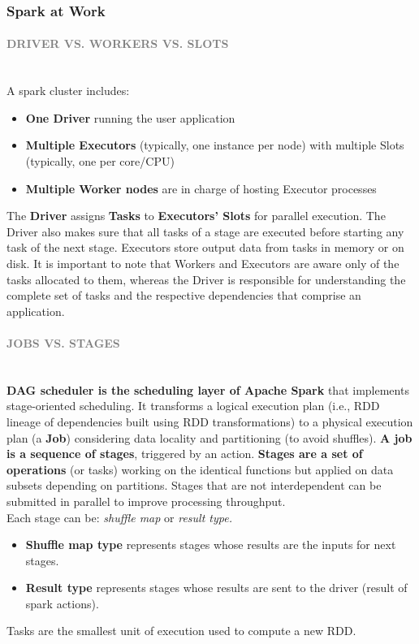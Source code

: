 \documentclass[10pt,a4paper]{article}
\newcommand{\myparagraph}[1]{\paragraph{\normalsize{\textcolor{gray}{\uppercase{\textbf{#1}}}} }\mbox{} \vspace{0.5em}\\}
\begin{document}
\subsubsection{Spark at Work}
\myparagraph{Driver vs. Workers vs. Slots}
A spark cluster includes:
\begin{itemize}
	\item \textbf{One Driver} running the user application
	\item \textbf{Multiple Executors} (typically, one instance per node) with multiple Slots (typically, one per core/CPU)
	\item \textbf{Multiple Worker nodes} are in charge of hosting Executor processes
\end{itemize}
The \textbf{Driver} assigns \textbf{Tasks} to \textbf{Executors’ Slots} for parallel execution. The Driver also makes sure that all tasks of a stage are executed before starting any task of the next stage.
Executors store output data from tasks in memory or on disk. It is important to note that Workers and Executors are aware only of the tasks allocated to them, whereas the Driver is responsible for understanding the complete set of tasks and the respective dependencies that comprise an application.
\myparagraph{Jobs vs. Stages}
\textbf{DAG scheduler is the scheduling layer of Apache Spark} that implements stage-oriented scheduling. It transforms a logical execution plan (i.e., RDD lineage of dependencies built using RDD transformations) to a physical execution plan (a \textbf{Job}) considering data locality and partitioning (to avoid shuffles). \textbf{A job is a sequence of stages}, triggered by an action. \textbf{Stages are a set of operations} (or tasks) working on the identical functions but applied on data subsets depending on partitions. Stages that are not interdependent can be submitted in parallel to improve processing throughput.  \\
Each stage can be: \textit{shuffle map} or \textit{result type.}
\begin{itemize}
	\item \textbf{Shuffle map type} represents stages whose results are the inputs for next stages.
	\item \textbf{Result type} represents stages whose results are sent to the driver (result of spark actions).
\end{itemize}
Tasks are the smallest unit of execution used to compute a new RDD.
\end{document}
